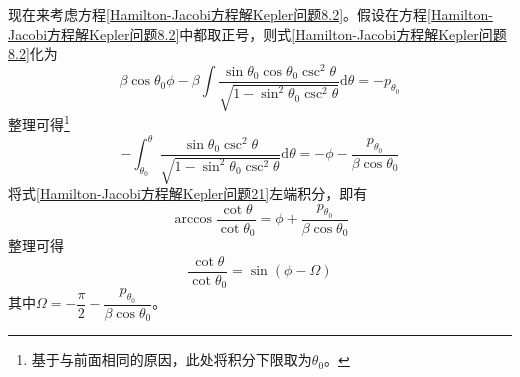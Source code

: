 现在来考虑方程\eqref{Hamilton-Jacobi方程解Kepler问题8.2}。假设在方程\eqref{Hamilton-Jacobi方程解Kepler问题8.2}中都取正号，则式\eqref{Hamilton-Jacobi方程解Kepler问题8.2}化为
\begin{equation*}
	\beta\cos\theta_0\phi - \beta \int \frac{\sin\theta_0\cos\theta_0\csc^2\theta}{\sqrt{1-\sin^2\theta_0\csc^2\theta}}\mathrm{d}\theta = -p_{\theta_0}
\end{equation*}
整理可得\footnote{基于与前面相同的原因，此处将积分下限取为$\theta_0$。}
\begin{equation}
	-\int_{\theta_0}^\theta \frac{\sin\theta_0\csc^2\theta}{\sqrt{1-\sin^2\theta_0\csc^2\theta}} \mathrm{d}\theta = -\phi - \frac{p_{\theta_0}}{\beta\cos\theta_0}
	\label{Hamilton-Jacobi方程解Kepler问题21}
\end{equation}
将式\eqref{Hamilton-Jacobi方程解Kepler问题21}左端积分，即有
\begin{equation}
	\arccos \frac{\cot\theta}{\cot\theta_0} = \phi + \frac{p_{\theta_0}}{\beta\cos \theta_0}
	\label{Hamilton-Jacobi方程解Kepler问题22}
\end{equation}
整理可得
\begin{equation}
	\frac{\cot\theta}{\cot\theta_0} = \sin(\phi-\varOmega)
	\label{Hamilton-Jacobi方程解Kepler问题23}
\end{equation}
其中$\varOmega = -\dfrac{\pi}{2}-\dfrac{p_{\theta_0}}{\beta\cos \theta_0}$。

